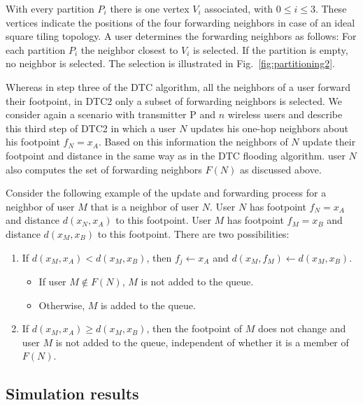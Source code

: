 With every partition $P_i$ there is one vertex $V_i$ associated, with $0\leq i\leq3$. These vertices indicate the positions of the four forwarding neighbors in case of an ideal square tiling topology. A user determines the forwarding neighbors as follows: For each partition $P_i$ the neighbor closest to $V_i$ is selected. If the partition is empty, no neighbor is selected. The selection is illustrated in Fig.~\ref{fig:partitioning2}.

Whereas in step three of the DTC algorithm, all the neighbors of a user forward their footpoint, in DTC2 only a subset of forwarding neighbors is selected. We consider again a scenario with transmitter P and $n$ wireless users and describe this third step of DTC2 in which a user $N$ updates his one-hop neighbors about his footpoint $f_N=x_A$. Based on this information the neighbors of $N$ update their footpoint and distance in the same way as in the DTC flooding algorithm. user $N$ also computes the set of forwarding neighbors $F(N)$ as discussed above. 

Consider the following example of the update and forwarding process for a neighbor of user $M$ that is a neighbor of user $N$. User $N$ has footpoint $f_N=x_A$ and distance $d(x_N,x_A)$ to this footpoint. User $M$ has footpoint $f_M=x_B$ and distance $d(x_M,x_B)$ to this footpoint. There are two possibilities:

\begin{enumerate}
\item If $d(x_M,x_A) < d(x_M,x_B)$, then $f_j \leftarrow x_A$ and $d(x_M,f_M) \leftarrow d(x_M,x_B)$. 
	\begin{itemize}
	\item If user $M \not\in F(N)$, $M$ is not added to the queue.
	\item Otherwise, $M$ is added to the queue.
	\end{itemize}
\item If $d(x_M,x_A) \geq d(x_M,x_B)$, then the footpoint of $M$ does not change and user $M$ is not added to the queue, independent of whether it is a member of $F(N)$.
\end{enumerate}
 
\subsection{Simulation results}


